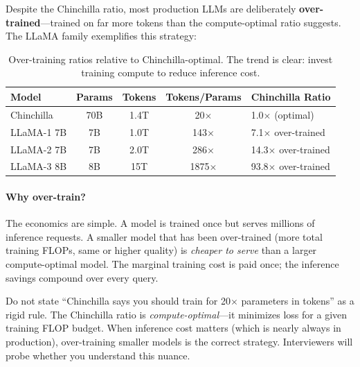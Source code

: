 Despite the Chinchilla ratio, most production LLMs are deliberately
\textbf{over-trained}---trained on far more tokens than the compute-optimal
ratio suggests.  The LLaMA family exemplifies this strategy:

\begin{table}[H]
\centering
\small
\begin{tabularx}{\textwidth}{@{}l c c c X@{}}
\toprule
\textbf{Model} & \textbf{Params} & \textbf{Tokens} & \textbf{Tokens/Params}
& \textbf{Chinchilla Ratio} \\
\midrule
Chinchilla     & 70B  & 1.4T  & 20$\times$ & 1.0$\times$ (optimal) \\
LLaMA-1 7B    & 7B   & 1.0T  & 143$\times$ & 7.1$\times$ over-trained \\
LLaMA-2 7B    & 7B   & 2.0T  & 286$\times$ & 14.3$\times$ over-trained \\
LLaMA-3 8B    & 8B   & 15T   & 1875$\times$ & 93.8$\times$ over-trained \\
\bottomrule
\end{tabularx}
\caption{Over-training ratios relative to Chinchilla-optimal.  The trend is
clear: invest training compute to reduce inference cost.}
\label{tab:overtraining}
\end{table}

\paragraph{Why over-train?}
The economics are simple.  A model is trained once but serves millions of
inference requests.  A smaller model that has been over-trained (more total
training FLOPs, same or higher quality) is \emph{cheaper to serve} than a
larger compute-optimal model.  The marginal training cost is paid once; the
inference savings compound over every query.

\begin{warningbox}
Do not state ``Chinchilla says you should train for 20$\times$ parameters in
tokens'' as a rigid rule.  The Chinchilla ratio is \emph{compute-optimal}---it
minimizes loss for a given training FLOP budget.  When inference cost matters
(which is nearly always in production), over-training smaller models is the
correct strategy.  Interviewers will probe whether you understand this nuance.
\end{warningbox}


